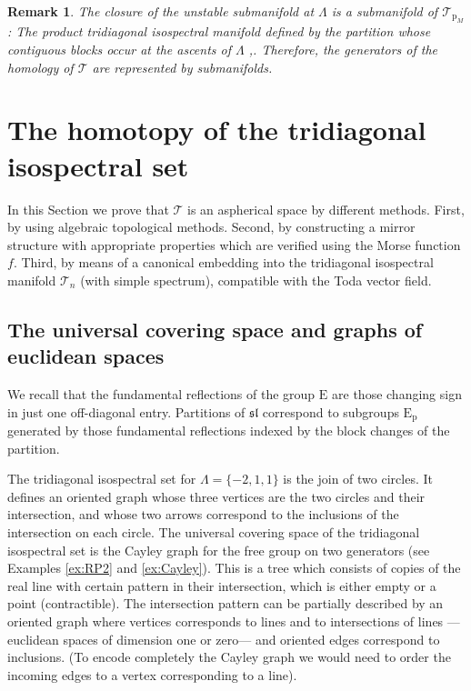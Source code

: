 \documentclass[reqno]{amsart}
\newcommand{\p}{\mathrm{p}}
\renewcommand{\sl}{\mathfrak{sl}}
\newcommand{\cT}{\mathcal{T}}
\newcommand{\E}{\mathrm{E}}
\newtheorem{remark}[theorem]{Remark}
\begin{document}
\begin{remark}\label{rem:closure} The closure of the unstable submanifold at $\Lambda$ is a submanifold of $\cT_{\p_M}$:  The product tridiagonal isospectral manifold  defined by the partition whose contiguous blocks occur at the ascents of $\Lambda$ \cite[Section 9]{Da2},\cite[Proposition 2]{Fr}. Therefore, the generators of the homology of $\cT$ are represented by submanifolds.
\end{remark}

\section{The homotopy of the tridiagonal isospectral set}\label{ssec:homotopy}
In this Section we prove that $\cT$ is an aspherical space by different methods. First, by using algebraic topological methods. Second, by constructing a mirror structure with appropriate properties \cite{Da1} which are verified using the Morse function $f$. Third,  by means of a canonical embedding into the tridiagonal isospectral  manifold $\cT_{n}$ (with simple spectrum), compatible with the Toda vector field.

\subsection{The universal covering space and graphs of euclidean spaces}

We recall that the fundamental reflections of the  group $\mathrm{E}$ are those changing sign in just one off-diagonal entry. Partitions of $\sl$ correspond to subgroups $\E_\p$ generated by those fundamental reflections indexed by the block changes of the partition.

The tridiagonal isospectral set for $\Lambda=\{-2,1,1\}$ is the join of two circles. It defines an oriented graph whose three vertices are the two circles and their intersection, and whose two arrows correspond to the inclusions of the intersection on each circle.
The universal covering space of the tridiagonal isospectral set is the Cayley graph for the free group on two generators (see Examples \ref{ex:RP2} and \ref{ex:Cayley}). This is a tree which  consists of copies of the real line with certain pattern in their intersection, which is either empty or a point (contractible). The intersection pattern can be partially described by an oriented graph where vertices corresponds to lines and to intersections of lines ---euclidean spaces of dimension one or zero--- and oriented edges correspond to inclusions. (To encode completely the Cayley graph we would need to order the incoming edges to a vertex corresponding to a line).
\end{document}
